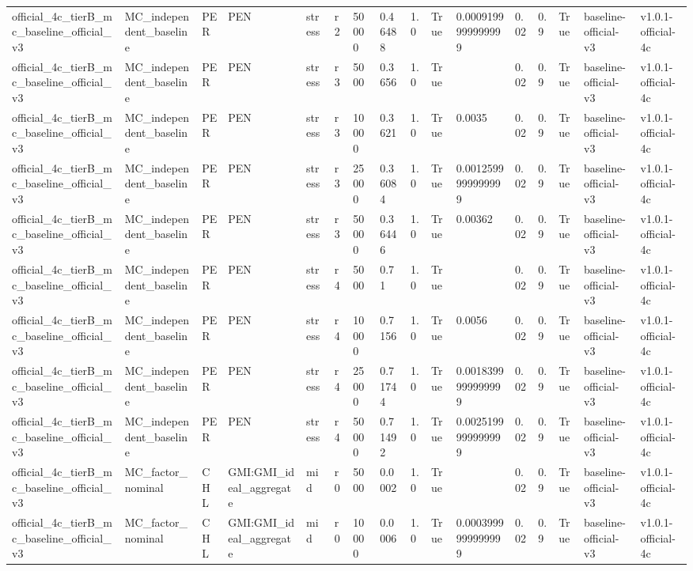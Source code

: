 \begin{table}[!htbp]
\begin{tabular}{llllllllllllllll}
official\_4c\_tierB\_mc\_baseline\_official\_v3 & MC\_independent\_baseline & PER & PEN & stress & r2 & 50000 & 0.46488 & 1.0 & True & 0.0009199999999999 & 0.02 & 0.9 & True & baseline-official-v3 & v1.0.1-official-4c \\
official\_4c\_tierB\_mc\_baseline\_official\_v3 & MC\_independent\_baseline & PER & PEN & stress & r3 & 5000 & 0.3656 & 1.0 & True &  & 0.02 & 0.9 & True & baseline-official-v3 & v1.0.1-official-4c \\
official\_4c\_tierB\_mc\_baseline\_official\_v3 & MC\_independent\_baseline & PER & PEN & stress & r3 & 10000 & 0.3621 & 1.0 & True & 0.0035 & 0.02 & 0.9 & True & baseline-official-v3 & v1.0.1-official-4c \\
official\_4c\_tierB\_mc\_baseline\_official\_v3 & MC\_independent\_baseline & PER & PEN & stress & r3 & 25000 & 0.36084 & 1.0 & True & 0.0012599999999999 & 0.02 & 0.9 & True & baseline-official-v3 & v1.0.1-official-4c \\
official\_4c\_tierB\_mc\_baseline\_official\_v3 & MC\_independent\_baseline & PER & PEN & stress & r3 & 50000 & 0.36446 & 1.0 & True & 0.00362 & 0.02 & 0.9 & True & baseline-official-v3 & v1.0.1-official-4c \\
official\_4c\_tierB\_mc\_baseline\_official\_v3 & MC\_independent\_baseline & PER & PEN & stress & r4 & 5000 & 0.71 & 1.0 & True &  & 0.02 & 0.9 & True & baseline-official-v3 & v1.0.1-official-4c \\
official\_4c\_tierB\_mc\_baseline\_official\_v3 & MC\_independent\_baseline & PER & PEN & stress & r4 & 10000 & 0.7156 & 1.0 & True & 0.0056 & 0.02 & 0.9 & True & baseline-official-v3 & v1.0.1-official-4c \\
official\_4c\_tierB\_mc\_baseline\_official\_v3 & MC\_independent\_baseline & PER & PEN & stress & r4 & 25000 & 0.71744 & 1.0 & True & 0.0018399999999999 & 0.02 & 0.9 & True & baseline-official-v3 & v1.0.1-official-4c \\
official\_4c\_tierB\_mc\_baseline\_official\_v3 & MC\_independent\_baseline & PER & PEN & stress & r4 & 50000 & 0.71492 & 1.0 & True & 0.0025199999999999 & 0.02 & 0.9 & True & baseline-official-v3 & v1.0.1-official-4c \\
official\_4c\_tierB\_mc\_baseline\_official\_v3 & MC\_factor\_nominal & CHL & GMI:GMI\_ideal\_aggregate & mid & r0 & 5000 & 0.0002 & 1.0 & True &  & 0.02 & 0.9 & True & baseline-official-v3 & v1.0.1-official-4c \\
official\_4c\_tierB\_mc\_baseline\_official\_v3 & MC\_factor\_nominal & CHL & GMI:GMI\_ideal\_aggregate & mid & r0 & 10000 & 0.0006 & 1.0 & True & 0.0003999999999999 & 0.02 & 0.9 & True & baseline-official-v3 & v1.0.1-official-4c \\

\end{tabular}
\end{table}
